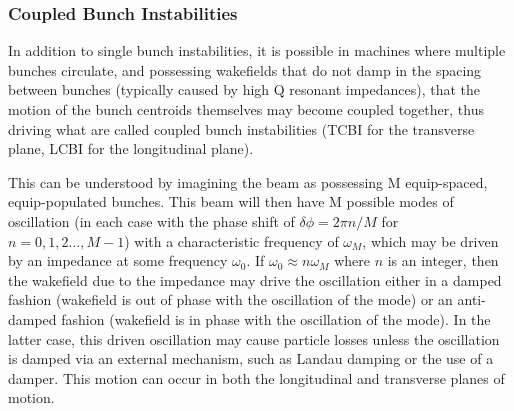 \subsubsection{Coupled Bunch Instabilities}

In addition to single bunch instabilities, it is possible in machines where multiple bunches circulate, and possessing wakefields that do not damp in the spacing between bunches (typically caused by high Q resonant impedances), that the motion of the bunch centroids themselves may become coupled together, thus driving what are called coupled bunch instabilities (TCBI for the transverse plane, LCBI for the longitudinal plane). 

This can be understood by imagining the beam as possessing M equip-spaced, equip-populated bunches. This beam will then have M possible modes of oscillation (in each case with the phase shift of $\delta \phi = 2\pi n/M$ for $n = 0,1,2..., M-1$) with a characteristic frequency of $\omega_{M}$, which may be driven by an impedance at some frequency $\omega_{0}$. If $\omega_{0} \approx n\omega_{M}$ where $n$ is an integer, then the wakefield due to the impedance may drive the oscillation either in a damped fashion (wakefield is out of phase with the oscillation of the mode) or an anti-damped fashion (wakefield is in phase with the oscillation of the mode). In the latter case, this driven oscillation may cause particle losses unless the oscillation is damped via an external mechanism, such as Landau damping or the use of a damper. This motion can occur in both the longitudinal and transverse planes of motion.

